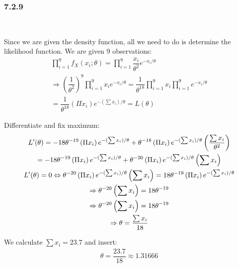 \subsubsection{7.2.9}\hfill\\\par
\noindent Since we are given the density function, all we need to do is determine the likelihood function. We are given 9 observations:
\begin{equation*}
  \begin{gathered}
    \prod_{i=1}^{9}f_X(x_i;\theta) = \prod_{i=1}^{9}\dfrac{x_i}{\theta^2}e^{-x_i/\theta}\\
    \Rightarrow \left(\dfrac{1}{\theta^2}\right)^9\prod_{i=1}^{9}x_ie^{-x_i/\theta} = \dfrac{1}{\theta^{18}}\prod_{i=1}^{9}x_i\prod_{i=1}^{9}e^{-x_i/\theta}\\
    = \dfrac{1}{\theta^{18}}\left(\Pi x_i\right)e^{-(\sum x_i)/\theta} = L(\theta)
  \end{gathered}
\end{equation*}\par
\noindent Differentiate and fix maximum:
\begin{equation*}
  \begin{gathered}
    L^{\prime}(\theta) = -18\theta^{-19}\left(\Pi x_i\right)e^{-(\sum x_i)/\theta} + \theta^{-18}\left(\Pi x_i\right)e^{-(\sum x_i)/\theta}\left(\dfrac{\sum x_i}{\theta^2}\right)\\
    = -18\theta^{-19}\left(\Pi x_i\right)e^{-(\sum x_i)/\theta}+\theta^{-20}\left(\Pi x_i\right)e^{-(\sum x_i)/\theta}\left(\sum x_i\right)\\
    L^{\prime}(\theta) = 0\Leftrightarrow \theta^{-20}\left(\Pi x_i\right)e^{-(\sum x_i)/\theta}\left(\sum x_i\right) = 18\theta^{-19}\left(\Pi x_i\right)e^{-(\sum x_i)/\theta}\\
    \Rightarrow \theta^{-20}\left(\sum x_i\right) = 18\theta^{-19}\\
    \Rightarrow \theta^{-20}\left(\sum x_i\right) = 18\theta^{-19}\\
    \Rightarrow \theta = \dfrac{\sum x_i}{18}
  \end{gathered}
\end{equation*}\par
\noindent We calculate $\sum x_i = 23.7$ and insert:
\begin{equation*}
  \begin{gathered}
    \theta = \dfrac{23.7}{18}\approx 1.31666
  \end{gathered}
\end{equation*}
